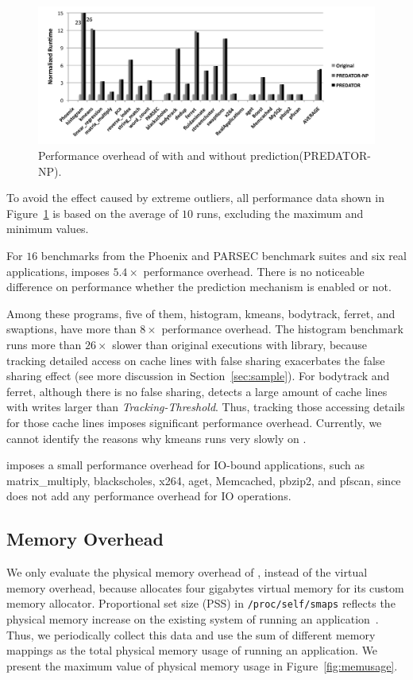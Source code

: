 \begin{figure}[ht]
\begin{center}
\includegraphics[width=6.5in]{fig/perf}
\end{center}
\caption{
Performance overhead of \Predator{} with and without prediction(PREDATOR-NP).
\label{fig:perf}}
\end{figure}

To avoid the effect caused by extreme outliers, all performance data shown in Figure~\ref{fig:perf} is based on the average of $10$ runs, excluding the maximum and minimum values. 

For $16$ benchmarks from the Phoenix and PARSEC benchmark suites and six real applications, \Predator{} imposes $5.4\times$ performance overhead. There is no noticeable difference on performance whether the prediction mechanism is enabled or not. 
 
Among these programs, five of them, histogram, kmeans, bodytrack, ferret, and swaptions, have more than $8\times$ performance overhead. The histogram benchmark runs more than $26\times$ slower than original executions with \pthreads{} library, because tracking detailed access on cache lines with false sharing exacerbates the false sharing effect (see more discussion in Section~\ref{sec:sample}).  For bodytrack and ferret, although there is no false sharing, \Predator{} detects a large amount of cache lines with writes larger than {\it Tracking-Threshold}. Thus, tracking those accessing details for those cache lines imposes significant performance overhead. Currently, we cannot identify the reasons why kmeans runs very slowly on \Predator{}.
   
\Predator{} imposes a small performance overhead for IO-bound applications, such as matrix\_multiply, blackscholes, x264, aget, Memcached, pbzip2, and pfscan, since \Predator{} does not add any performance overhead for IO operations.  

\subsection{Memory Overhead}
\label{sec:memoverhead}
We only evaluate the physical memory overhead of \Predator{}, instead of the virtual memory overhead, because \Predator{} allocates four gigabytes virtual memory for its custom memory allocator. Proportional set size (PSS) in \texttt{/proc/self/smaps} reflects the physical memory increase on the existing system of running an application~\cite{memusage}. Thus, we periodically collect this data and use the sum of different memory mappings as the total physical memory usage of running an application. We present the maximum value of physical memory usage in Figure~\ref{fig:memusage}. 

